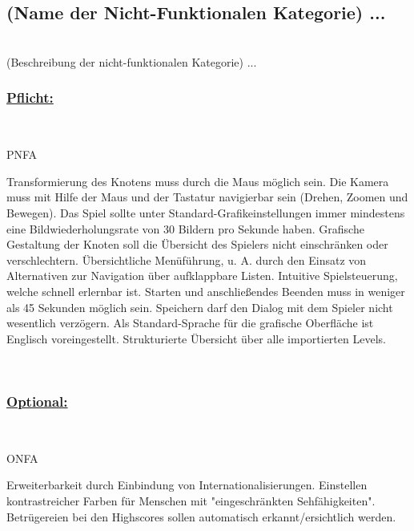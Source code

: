 %
%

\subsection{(Name der Nicht-Funktionalen Kategorie) ...}

%
%
\renewcommand{\K}{}

~\\
(Beschreibung der nicht-funktionalen Kategorie) ...
\\

%
%
\subsubsection*{\underline{Pflicht:}}~\\

\begin{ids}{\gls{PNFA\K}} 

 	\id[10] Transformierung des Knotens muss durch die Maus möglich sein.
 	\id[20] Die Kamera muss mit Hilfe der Maus und der Tastatur navigierbar sein (Drehen,
Zoomen und Bewegen).
 	\id[30] Das Spiel sollte unter Standard-Grafikeinstellungen immer mindestens eine Bildwiederholungsrate
von 30 Bildern pro Sekunde haben.
 	\id[40] Grafische Gestaltung der Knoten soll die Übersicht des Spielers nicht einschränken
oder verschlechtern.
 	\id[50] Übersichtliche Menüführung, u. A. durch den Einsatz von Alternativen zur Navigation
über aufklappbare Listen.
  	\id[60] Intuitive Spielsteuerung, welche schnell erlernbar ist.
  	\id[70] Starten und anschließendes Beenden muss in weniger als 45 Sekunden möglich sein.
  	\id[80] Speichern darf den Dialog mit dem Spieler nicht wesentlich verzögern.
  	\id[90] Als Standard-Sprache für die grafische Oberfläche ist Englisch voreingestellt.
  	\id[100] Strukturierte Übersicht über alle importierten Levels.
  		

	
\end{ids}

~\\


%
%
\subsubsection*{\underline{Optional:}}~\\


\begin{ids}{\gls{ONFA\K}}

 	\id[110] Erweiterbarkeit durch Einbindung von Internationalisierungen.
 	\id[120] Einstellen kontrastreicher Farben für Menschen mit "eingeschränkten Sehfähigkeiten".
  	\id[130] Betrügereien bei den Highscores sollen automatisch erkannt/ersichtlich werden.
	
\end{ids}

~\\